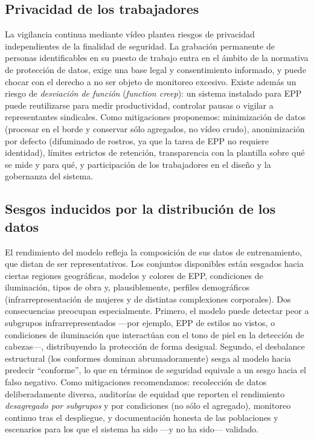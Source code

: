 \documentclass{article}
\begin{document}
\subsection{Privacidad de los trabajadores}
La vigilancia continua mediante vídeo plantea riesgos de privacidad
independientes de la finalidad de seguridad. La grabación permanente de personas
identificables en su puesto de trabajo entra en el ámbito de la normativa de
protección de datos, exige una base legal y consentimiento informado, y puede
chocar con el derecho a no ser objeto de monitoreo excesivo. Existe además un
riesgo de \emph{desviación de función} (\emph{function creep}): un sistema
instalado para EPP puede reutilizarse para medir productividad, controlar pausas
o vigilar a representantes sindicales. Como mitigaciones proponemos: minimización
de datos (procesar en el borde y conservar sólo agregados, no vídeo crudo),
anonimización por defecto (difuminado de rostros, ya que la tarea de EPP no
requiere identidad), límites estrictos de retención, transparencia con la
plantilla sobre qué se mide y para qué, y participación de los trabajadores en el
diseño y la gobernanza del sistema.

\subsection{Sesgos inducidos por la distribución de los datos}
El rendimiento del modelo refleja la composición de sus datos de entrenamiento,
que distan de ser representativos. Los conjuntos disponibles están sesgados hacia
ciertas regiones geográficas, modelos y colores de EPP, condiciones de
iluminación, tipos de obra y, plausiblemente, perfiles demográficos
(infrarrepresentación de mujeres y de distintas complexiones corporales). Dos
consecuencias preocupan especialmente. Primero, el modelo puede detectar peor a
subgrupos infrarrepresentados —por ejemplo, EPP de estilos no vistos, o
condiciones de iluminación que interactúan con el tono de piel en la detección de
cabezas—, distribuyendo la protección de forma desigual. Segundo, el desbalance
estructural (los conformes dominan abrumadoramente) sesga al modelo hacia
predecir ``conforme'', lo que en términos de seguridad equivale a un sesgo hacia
el falso negativo. Como mitigaciones recomendamos: recolección de datos
deliberadamente diversa, auditorías de equidad que reporten el rendimiento
\emph{desagregado por subgrupos} y por condiciones (no sólo el agregado),
monitoreo continuo tras el despliegue, y documentación honesta de las
poblaciones y escenarios para los que el sistema ha sido —y no ha sido—
validado.
\end{document}

